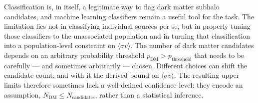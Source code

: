 Classification is, in itself, a legitimate way to flag dark matter subhalo candidates, and machine learning classifiers remain a useful tool for the task.
The limitation lies not in classifying individual sources per se, but in properly tuning those classifiers to the unassociated population and in
turning that classification into a population-level constraint on $\langle\sigma v\rangle$.
The number of dark matter candidates depends on an arbitrary probability threshold $p_\mathrm{DM} > p_\mathrm{threshold}$ that needs to be carefully --- and sometimes arbitrarily --- chosen.
Different choices can shift the candidate count, and with it the derived bound on $\langle\sigma v\rangle$.
The resulting upper limits therefore sometimes lack a well-defined confidence level: they encode an assumption, $N_\mathrm{DM} \leq N_\mathrm{candidates}$, rather than a statistical inference.
